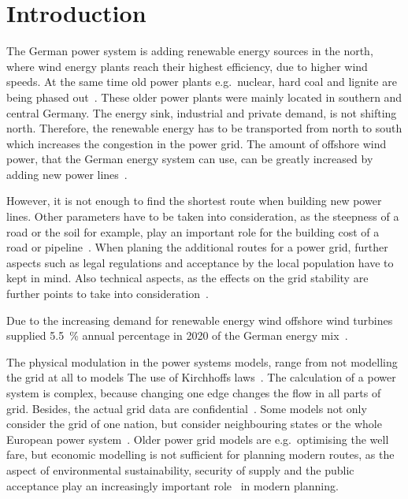 \documentclass[acmtog]{acmart}
\begin{document}
	\section{Introduction}\label{sec:introduction}

	The German power system is adding renewable energy sources in the north, where wind energy plants reach their highest efficiency, due to higher wind speeds.
	At the same time old power plants e.g.\ nuclear, hard coal and lignite are being phased out~\cite{eser-frey_analyzing_2012}.
	These older power plants were mainly located in southern and central Germany. 
	The energy sink,  industrial and private demand, is not shifting north.
	Therefore, the renewable energy has to be transported from north to south which increases the congestion in the power grid. 
	The amount of offshore wind power, that the German energy system can use, can be greatly increased by adding new power lines~\cite{leuthold_nodal_2005}.
	
	However, it is not enough to find the shortest route when building new power lines.
	Other parameters have to be taken into consideration, as the steepness of a road or the soil for example, play an important role for the building cost of a road or pipeline~\cite{suleiman_optimal_2015}.
	When planing the additional routes for a power grid, further aspects such as legal regulations and acceptance
	by the local population have to kept in mind.
	Also technical aspects, as the effects on the grid stability are further points to take into consideration~\cite{schafer_understanding_2022}.
	
	Due to the increasing demand for renewable energy wind offshore wind turbines supplied 5.5~\% annual percentage in 2020 of the German energy mix~\cite{noauthor_nettostromerzeugung_2021}.

	 The physical modulation in the power systems models, range from not modelling the grid at all to models  The use of Kirchhoffs laws~\cite{bertsch_participatory_2016}.
	The calculation of a power system is complex, because changing one edge changes the flow in all parts of grid.
	Besides, the actual grid data are confidential~\cite{bertsch_participatory_2016}.
	Some models not only consider the grid of one nation, but consider neighbouring states or the whole European power system~\cite{dietrich_will_2010}.	
	Older power grid models are e.g.\ optimising the well fare, but economic modelling is not sufficient for planning modern routes, as the aspect of environmental sustainability, security of supply and the public acceptance play an increasingly important role~\cite{hauff_gesellschaftliche_2011} in modern planning.
	
\end{document}
